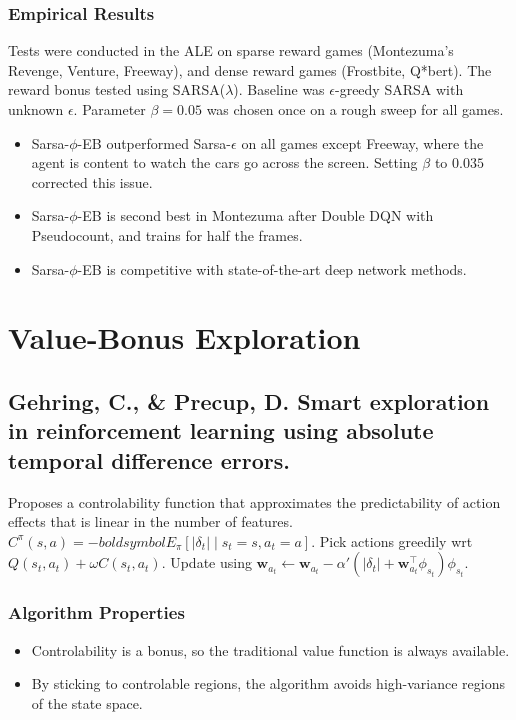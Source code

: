 \documentclass[12pt, oneside]{amsart}
\begin{document}
	\subsubsection*{Empirical Results}
	Tests were conducted in the ALE on sparse reward games (Montezuma's Revenge, Venture, Freeway), and dense reward games (Frostbite, Q*bert). The reward bonus tested using SARSA($\lambda$). Baseline was $\epsilon$-greedy SARSA with unknown $\epsilon$. Parameter $\beta = 0.05$ was chosen once on a rough sweep for all games.
	\begin{itemize}
		\item Sarsa-$\phi$-EB outperformed Sarsa-$\epsilon$ on all games except Freeway, where the agent is content to watch the cars go across the screen. Setting $\beta$ to $0.035$ corrected this issue.
		\item Sarsa-$\phi$-EB is second best in Montezuma after Double DQN with Pseudocount, and trains for half the frames. 
		\item Sarsa-$\phi$-EB is competitive with state-of-the-art deep network methods.
	\end{itemize}
	
	\section*{Value-Bonus Exploration}
	
	\subsection*{Gehring, C., \& Precup, D. Smart exploration in reinforcement learning using absolute temporal difference errors.}
	Proposes a controlability function that approximates the predictability of action effects that is linear in the number of features. $C^\pi(s,a)=-boldsymbol{E}_\pi[|\delta_t| \mid s_t=s,a_t=a].$ Pick actions greedily wrt $Q(s_t, a_t) + \omega C(s_t, a_t)$.  Update using $\boldsymbol{w}_{a_t} \leftarrow \boldsymbol{w}_{a_t} - \alpha\prime(|\delta_t| + \boldsymbol{w}^\top_{a_t}\phi_{s_t})\phi_{s_t}$.
	
	\subsubsection*{Algorithm Properties}
	\begin{itemize}
		\item Controlability is a bonus, so the traditional value function is always available.
		\item By sticking to controlable regions, the algorithm avoids high-variance regions of the state space.
	\end{itemize}
	
\end{document}
